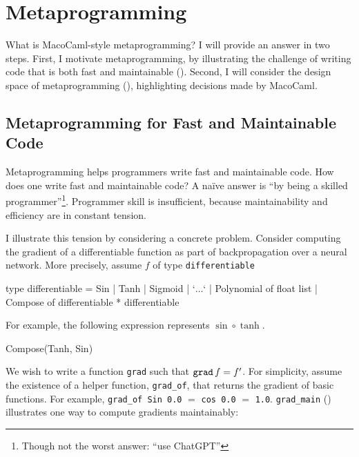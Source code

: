\section{Metaprogramming}\label{section:metaprogramming-technical}
What is MacoCaml-style metaprogramming? I will provide an answer in two steps. First, I motivate metaprogramming, by illustrating the challenge of writing code that is both fast and maintainable (). Second, I will consider the design space of metaprogramming (), highlighting decisions made by MacoCaml.

\subsection{Metaprogramming for Fast and Maintainable Code}\label{subsection:metaprogramming-motivation}

Metaprogramming helps programmers write fast and maintainable code. How does one write fast and maintainable code? A naïve answer is ``by being a skilled programmer''\footnote{Though not the worst answer: ``use ChatGPT''}. Programmer skill is insufficient, because maintainability and efficiency are in constant tension. 

I illustrate this tension by considering a concrete problem. Consider computing the gradient of a differentiable function as part of backpropagation over a neural network. More precisely, assume $f$ of type \texttt{differentiable}

\begin{ocaml}
type differentiable = Sin | Tanh | Sigmoid | `$\ldots$`
                    | Polynomial of float list
                    | Compose of differentiable * differentiable
\end{ocaml}
For example, the following expression represents $\sin\circ \tanh$. 
\begin{ocaml}
Compose(Tanh, Sin)
\end{ocaml}

We wish to write a function \texttt{grad} such that $\text{\texttt{grad}} \, f = f'$. For simplicity, assume the existence of a helper function, \texttt{grad_of}, that returns the gradient of basic functions. For example, \texttt{grad_of Sin 0.0} $=$ \texttt{cos 0.0} $=$ \texttt{1.0}. \texttt{grad_main} () illustrates one way to compute gradients maintainably: 

